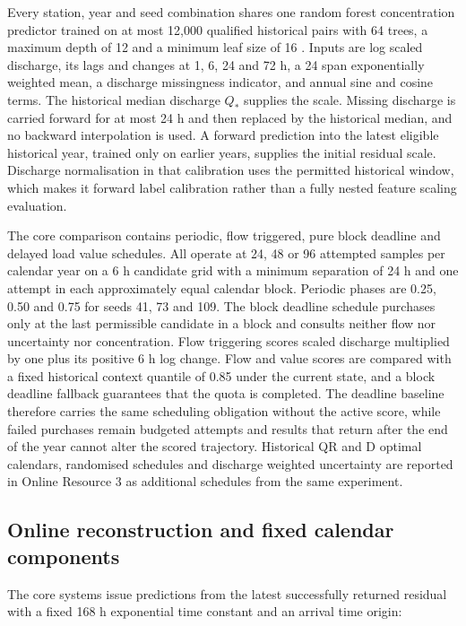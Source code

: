 \documentclass[lineno,pdflatex,sn-apa]{sn-jnl}%
\theoremstyle{thmstyleone}%
\theoremstyle{thmstyletwo}%
\theoremstyle{thmstylethree}%
\begin{document}
Every station, year and seed combination shares one random forest concentration predictor trained on at most 12,000 qualified historical pairs with 64 trees, a maximum depth of 12 and a minimum leaf size of 16 \citep{breiman2001}. Inputs are log scaled discharge, its lags and changes at 1, 6, 24 and 72 h, a 24 span exponentially weighted mean, a discharge missingness indicator, and annual sine and cosine terms. The historical median discharge $Q_*$ supplies the scale. Missing discharge is carried forward for at most 24 h and then replaced by the historical median, and no backward interpolation is used. A forward prediction into the latest eligible historical year, trained only on earlier years, supplies the initial residual scale. Discharge normalisation in that calibration uses the permitted historical window, which makes it forward label calibration rather than a fully nested feature scaling evaluation.

The core comparison contains periodic, flow triggered, pure block deadline and delayed load value schedules. All operate at 24, 48 or 96 attempted samples per calendar year on a 6 h candidate grid with a minimum separation of 24 h and one attempt in each approximately equal calendar block. Periodic phases are 0.25, 0.50 and 0.75 for seeds 41, 73 and 109. The block deadline schedule purchases only at the last permissible candidate in a block and consults neither flow nor uncertainty nor concentration. Flow triggering scores scaled discharge multiplied by one plus its positive 6 h log change. Flow and value scores are compared with a fixed historical context quantile of 0.85 under the current state, and a block deadline fallback guarantees that the quota is completed. The deadline baseline therefore carries the same scheduling obligation without the active score, while failed purchases remain budgeted attempts and results that return after the end of the year cannot alter the scored trajectory. Historical QR and D optimal calendars, randomised schedules and discharge weighted uncertainty are reported in Online Resource 3 as additional schedules from the same experiment.

\subsection{Online reconstruction and fixed calendar components}

The core systems issue predictions from the latest successfully returned residual with a fixed 168 h exponential time constant and an arrival time origin:
\end{document}
